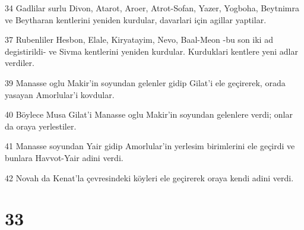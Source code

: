 \par 34 Gadlilar surlu Divon, Atarot, Aroer, Atrot-Sofan, Yazer, Yogboha, Beytnimra ve Beytharan kentlerini yeniden kurdular, davarlari için agillar yaptilar.
\par 37 Rubenliler Hesbon, Elale, Kiryatayim, Nevo, Baal-Meon -bu son iki ad degistirildi- ve Sivma kentlerini yeniden kurdular. Kurduklari kentlere yeni adlar verdiler.
\par 39 Manasse oglu Makir'in soyundan gelenler gidip Gilat'i ele geçirerek, orada yasayan Amorlular'i kovdular.
\par 40 Böylece Musa Gilat'i Manasse oglu Makir'in soyundan gelenlere verdi; onlar da oraya yerlestiler.
\par 41 Manasse soyundan Yair gidip Amorlular'in yerlesim birimlerini ele geçirdi ve bunlara Havvot-Yair adini verdi.
\par 42 Novah da Kenat'la çevresindeki köyleri ele geçirerek oraya kendi adini verdi.

\chapter{33}

